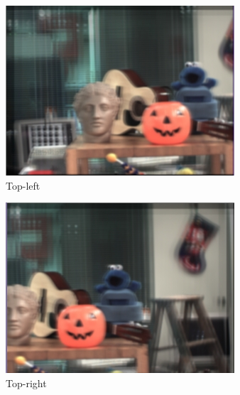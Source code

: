 \documentclass{article}
\begin{document}
\begin{figure}[htbp]
    \centering
    \begin{subfigure}[b]{0.23\textwidth} %
        \centering
        \includegraphics[width=\textwidth]{view1.png} %
        \caption{Top-left} %
    \end{subfigure}
    \hfill
    \begin{subfigure}[b]{0.23\textwidth} %
        \centering
        \includegraphics[width=\textwidth]{view2.png} %
        \caption{Top-right} %
    \end{subfigure}
    \hfill
    \begin{subfigure}[b]{0.23\textwidth} %

\end{subfigure}
\end{figure}
\end{document}
